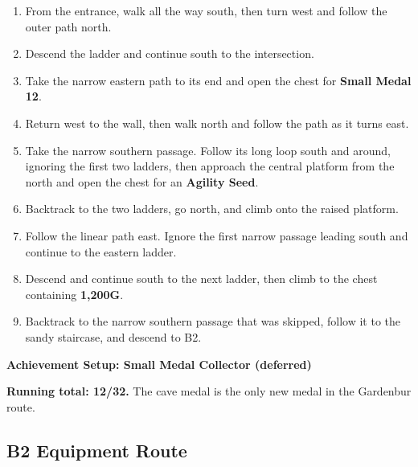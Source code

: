 \documentclass[
  american,
  10pt,
  letterpaper,
  oneside,
  open=any]{scrreprt}
\providecommand{\tightlist}{%
  \setlength{\itemsep}{0pt}\setlength{\parskip}{0pt}}
\begin{document}
\begin{enumerate}
\def\labelenumi{\arabic{enumi}.}
\tightlist
\item
  From the entrance, walk all the way south, then turn west and follow
  the outer path north.
\item
  Descend the ladder and continue south to the intersection.
\item
  Take the narrow eastern path to its end and open the chest for
  \textbf{Small Medal 12}.
\item
  Return west to the wall, then walk north and follow the path as it
  turns east.
\item
  Take the narrow southern passage. Follow its long loop south and
  around, ignoring the first two ladders, then approach the central
  platform from the north and open the chest for an \textbf{Agility
  Seed}.
\item
  Backtrack to the two ladders, go north, and climb onto the raised
  platform.
\item
  Follow the linear path east. Ignore the first narrow passage leading
  south and continue to the eastern ladder.
\item
  Descend and continue south to the next ladder, then climb to the chest
  containing \textbf{1,200G}.
\item
  Backtrack to the narrow southern passage that was skipped, follow it
  to the sandy staircase, and descend to B2.
\end{enumerate}

\begin{achievementsetup}

\textbf{Achievement Setup: Small Medal Collector (deferred)}

\textbf{Running total: 12/32.} The cave medal is the only new medal in
the Gardenbur route.

\end{achievementsetup}

\subsection{B2 Equipment Route}\label{b2-equipment-route}
\end{document}
